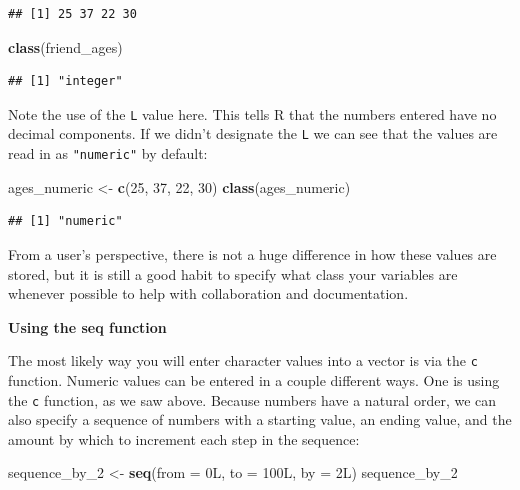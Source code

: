 \documentclass[]{tufte-book}
\newenvironment{Shaded}{\begin{snugshade}}{\end{snugshade}}
\newcommand{\AttributeTok}[1]{\textcolor[rgb]{0.13,0.29,0.53}{#1}}
\newcommand{\DataTypeTok}[1]{\textcolor[rgb]{0.13,0.29,0.53}{#1}}
\newcommand{\DecValTok}[1]{\textcolor[rgb]{0.00,0.00,0.81}{#1}}
\newcommand{\FunctionTok}[1]{\textcolor[rgb]{0.13,0.29,0.53}{\textbf{#1}}}
\newcommand{\NormalTok}[1]{#1}
\newcommand{\OtherTok}[1]{\textcolor[rgb]{0.56,0.35,0.01}{#1}}
\begin{document}
\begin{verbatim}
## [1] 25 37 22 30
\end{verbatim}

\begin{Shaded}
\begin{Highlighting}[]
\FunctionTok{class}\NormalTok{(friend\_ages)}
\end{Highlighting}
\end{Shaded}

\begin{verbatim}
## [1] "integer"
\end{verbatim}

Note the use of the \texttt{L} value here. This tells R that the numbers entered have no decimal components. If we didn't designate the \texttt{L} we can see that the values are read in as \texttt{"numeric"} by default:

\begin{Shaded}
\begin{Highlighting}[]
\NormalTok{ages\_numeric }\OtherTok{\textless{}{-}} \FunctionTok{c}\NormalTok{(}\DecValTok{25}\NormalTok{, }\DecValTok{37}\NormalTok{, }\DecValTok{22}\NormalTok{, }\DecValTok{30}\NormalTok{)}
\FunctionTok{class}\NormalTok{(ages\_numeric)}
\end{Highlighting}
\end{Shaded}

\begin{verbatim}
## [1] "numeric"
\end{verbatim}

From a user's perspective, there is not a huge difference in how these values are stored, but it is still a good habit to specify what class your variables are whenever possible to help with collaboration and documentation. \newline

\vspace*{0.2in}

\noindent\textbf{Using the seq function}\vspace*{0.1in}

The most likely way you will enter character values into a vector is via the \texttt{c} function. Numeric values can be entered in a couple different ways. One is using the \texttt{c} function, as we saw above. Because numbers have a natural order, we can also specify a sequence of numbers with a starting value, an ending value, and the amount by which to increment each step in the sequence:

\begin{Shaded}
\begin{Highlighting}[]
\NormalTok{sequence\_by\_2 }\OtherTok{\textless{}{-}} \FunctionTok{seq}\NormalTok{(}\AttributeTok{from =} \DecValTok{0}\DataTypeTok{L}\NormalTok{, }\AttributeTok{to =} \DecValTok{100}\DataTypeTok{L}\NormalTok{, }\AttributeTok{by =} \DecValTok{2}\DataTypeTok{L}\NormalTok{)}
\NormalTok{sequence\_by\_2}
\end{Highlighting}
\end{Shaded}
\end{document}
